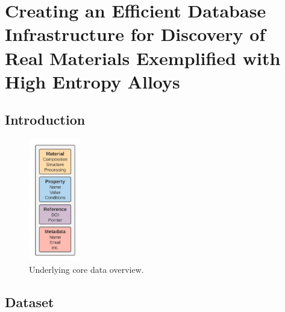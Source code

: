 \chapter{Creating an Efficient Database Infrastructure for Discovery of Real Materials Exemplified with High Entropy Alloys} \label{chap:ultera}

\section{Introduction} \label{ultera:sec:intro}
\todo

\cite{Debnath2021GenerativeAlloys}
\cite{Debnath2023ComparingAlloys}
\cite{Li2024DesignExperiments}

\begin{figure}[H]
    \centering
    \includegraphics[width=0.2\textwidth]{ultera/ULTERA Data Detail_material.png}
    \caption{Underlying core data overview.}
    \label{ultera:fig:material}
\end{figure}


\section{Dataset} \label{ultera:sec:datadescription}
\newcommand{\statisticstime}{April 2024}

\todo

